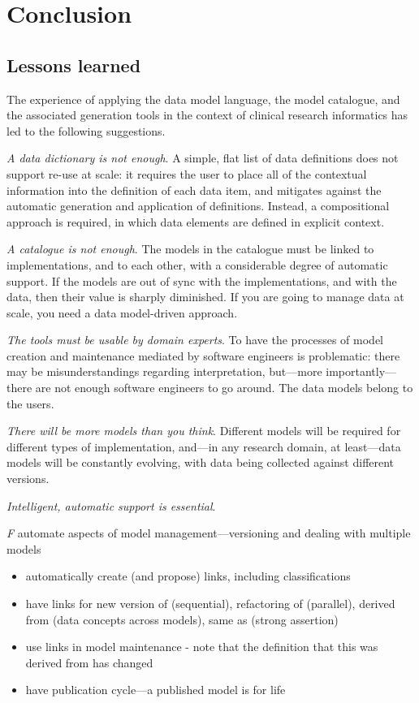 
\section{Conclusion}

\subsection{Lessons learned}

The experience of applying the data model language, the model
catalogue, and the associated generation tools in the context of
clinical research informatics has led to the following suggestions.

\textsl{A data dictionary is not enough}. A simple, flat list of data
definitions does not support re-use at scale: it requires the user to
place all of the contextual information into the definition of each
data item, and mitigates against the automatic generation and
application of definitions.  Instead, a compositional approach is
required, in which data elements are defined in explicit context.

\textsl{A catalogue is not enough}.  The models in the catalogue must
be linked to implementations, and to each other, with a considerable
degree of automatic support.  If the models are out of sync with the
implementations, and with the data, then their value is sharply
diminished.  If you are going to manage data at scale, you need a data
model-driven approach. 

\textsl{The tools must be usable by domain experts}. To have the
processes of model creation and maintenance mediated by software
engineers is problematic: there may be misunderstandings regarding
interpretation, but---more importantly---there are not enough software
engineers to go around.  The data models belong to the users. 

\textsl{There will be more models than you think}.  Different models
will be required for different types of implementation, and---in any
research domain, at least---data models will be constantly evolving,
with data being collected against different versions.  

\textsl{Intelligent, automatic support is essential}.  

\textsl{F} automate aspects of model management---versioning and dealing
  with multiple models
  \begin{itemize}
  \item automatically create (and propose) links, including
    classifications
  \item have links for new version of (sequential), refactoring of
    (parallel), derived from (data concepts across models), same as
    (strong assertion)
  \item use links in model maintenance - note that the definition that
    this was derived from has changed
  \item have publication cycle---a published model is for life
  \end{itemize}

